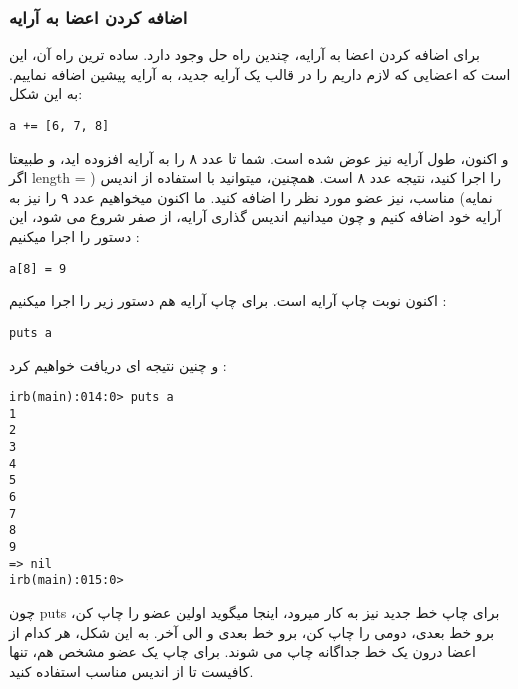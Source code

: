 \documentclass[11pt]{article}
\begin{document}
\subsubsection{اضافه کردن اعضا به آرایه}
برای اضافه کردن اعضا به آرایه، چندین راه حل وجود دارد. ساده ترین راه آن، این است که اعضایی که لازم داریم را در قالب یک آرایه جدید، به آرایه پیشین اضافه نماییم. به این شکل:
\begin{latin}
\begin{verbatim}
a += [6, 7, 8]
\end{verbatim}
\end{latin}
و اکنون، طول آرایه نیز عوض شده است. شما تا عدد ۸ را به آرایه افزوده اید، و طبیعتا اگر length را اجرا کنید، نتیجه عدد ۸ است. همچنین، میتوانید با استفاده از اندیس ( = نمایه) مناسب، نیز عضو مورد نظر را اضافه کنید. ما اکنون میخواهیم عدد ۹ را نیز به آرایه خود اضافه کنیم و چون میدانیم اندیس گذاری آرایه، از صفر شروع می شود، این دستور را اجرا میکنیم :
\begin{latin}
\begin{verbatim}
a[8] = 9
\end{verbatim}
\end{latin}
اکنون نوبت چاپ آرایه است. 
برای چاپ آرایه هم دستور زیر را اجرا میکنیم :
\begin{latin}
\begin{verbatim}
puts a
\end{verbatim}
\end{latin}
و چنین نتیجه ای دریافت خواهیم کرد :
\begin{latin}
\begin{verbatim}
irb(main):014:0> puts a
1
2
3
4
5
6
7
8
9
=> nil
irb(main):015:0>
\end{verbatim}
\end{latin}
چون puts برای چاپ خط جدید نیز به کار میرود، اینجا میگوید اولین عضو را چاپ کن، برو خط بعدی، دومی را چاپ کن، برو خط بعدی و الی آخر. به این شکل، هر کدام از اعضا درون یک خط جداگانه چاپ می شوند. برای چاپ یک عضو مشخص هم، تنها کافیست تا از اندیس مناسب استفاده کنید. 
\end{document}
